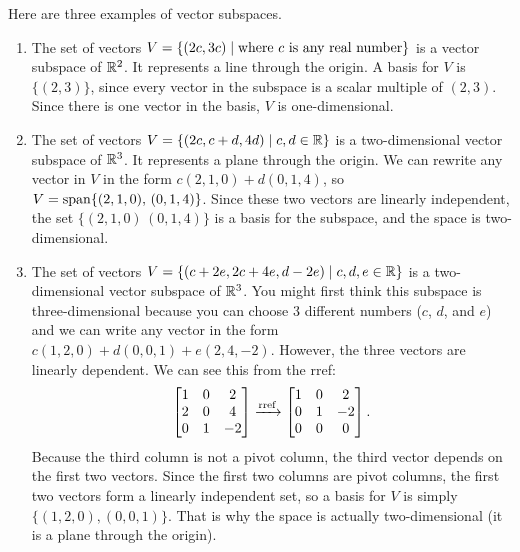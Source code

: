 \begin{example}Here are three examples of vector subspaces.
\begin{enumerate}
	\item 
The set of vectors $V=\{(2c,3c)\mid \text{where $c$ is any real number}\}$ is a vector subspace of $\mathbb{R}^2$. It represents a line through the origin.  A basis for $V$ is $\{(2,3)\}$, since every vector in the subspace is a scalar multiple of $(2,3)$.  Since there is one vector in the basis, $V$ is one-dimensional.
  \item
The set of vectors $V=\{(2c,c+d,4d)\mid c,d\in \mathbb{R}\}$ is a two-dimensional vector subspace of $\mathbb{R}^3$. It represents a plane through the origin. We can rewrite any vector in $V$ in the form $c(2,1,0)+d(0,1,4)$, so $V=\operatorname{span}\{(2,1,0),\, (0,1,4)\}$.  Since these two vectors are linearly independent, the set $\{(2,1,0)\, (0,1,4)\}$ is a basis for the subspace, and the space is two-dimensional.
\item
The set of vectors $V=\{(c+2e,2c+4e,d-2e)\mid c,d,e\in \mathbb{R}\}$ is a two-dimensional vector subspace of $\mathbb{R}^3$. You might first think this subspace is three-dimensional because you can choose 3 different numbers ($c$, $d$, and $e$) and we can write any vector in the form $c(1,2,0)+d(0,0,1)+e(2,4,-2)$.  However, the three vectors are linearly dependent.  We can see this from the rref:
\begin{equation*}
\begin{bmatrix}
\begin{matrix} 1\\2\\0 \end{matrix}&
\begin{matrix} 0\\0\\1 \end{matrix}&
\begin{matrix} 2\\4\\-2 \end{matrix}
\end{bmatrix}
\xrightarrow{\operatorname{rref}}
\begin{bmatrix}
\begin{matrix} 1\\0\\0 \end{matrix}&
\begin{matrix} 0\\1\\0 \end{matrix}&
\begin{matrix} 2\\-2\\0 \end{matrix}
\end{bmatrix}.
\end{equation*}
Because the third column is not a pivot column, the third vector depends on the first two vectors.  Since the first two columns are pivot columns, the first two vectors form a linearly independent set, so a basis for $V$ is simply $\{(1,2,0),(0,0,1)\}$.  That is why the space is actually two-dimensional (it is a plane through the origin).
\end{enumerate}
\end{example}
